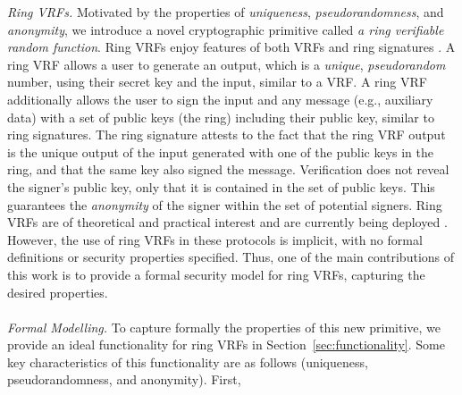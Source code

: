\noindent \emph{Ring VRFs.} Motivated by the properties of \emph{uniqueness}, \emph{pseudorandomness}, and \emph{anonymity}, we introduce a novel cryptographic primitive called \emph{a ring verifiable random function}.  Ring VRFs enjoy features of both VRFs \cite{vrf_micali}  and ring signatures \cite{ring_accountable,ring_efficient,ring_linkable,ring_noRO,ring_sublinear}. A ring VRF allows a user to generate an output, which is a \emph{unique}, \emph{pseudorandom} number, using their secret key and the input, similar to a VRF.  A ring VRF additionally allows the user to sign the input and any message (e.g., auxiliary data)  with a set of public keys (the ring) including their public key, similar to ring signatures. The ring signature attests to the fact that the ring VRF output is the unique output of the input generated with one of the public keys in the ring, and that the same key also signed the message. Verification does not reveal the signer's public key, only that it is contained in the set of public keys.
This guarantees the \emph{anonymity} of the signer within the set of potential signers.
Ring VRFs are of theoretical and practical interest and are currently being deployed \cite{Semaphore,BurdgesASV23a}.
However, the use of ring VRFs in these protocols is implicit, with no formal definitions or security properties specified. 
Thus, one of the main contributions of this work is to provide a formal security model for ring VRFs, capturing the desired properties.
\\\\
\noindent \emph{Formal Modelling.} To capture formally the properties of this new primitive, we provide an ideal functionality for ring VRFs in Section~\ref{sec:functionality}. Some key characteristics of this functionality are as follows (uniqueness, pseudorandomness, and anonymity). First, 
\\\\
